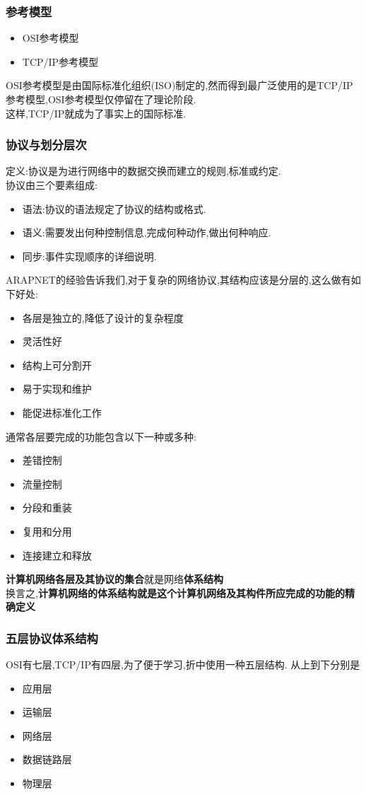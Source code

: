 \documentclass{ctexart}
\begin{document}
\subsubsection{参考模型}
\begin{itemize}
	\item OSI参考模型
	\item TCP/IP参考模型
\end{itemize}
OSI参考模型是由国际标准化组织(ISO)制定的,然而得到最广泛使用的是TCP/IP参考模型,OSI参考模型仅停留在了理论阶段.\\
这样,TCP/IP就成为了事实上的国际标准.
\subsubsection{协议与划分层次}
定义:协议是为进行网络中的数据交换而建立的规则,标准或约定.\\
协议由三个要素组成:
\begin{itemize}
	\item 语法:协议的语法规定了协议的结构或格式.
	\item 语义:需要发出何种控制信息,完成何种动作,做出何种响应.
	\item 同步:事件实现顺序的详细说明.
\end{itemize}
ARAPNET的经验告诉我们,对于复杂的网络协议,其结构应该是分层的,这么做有如下好处:
\begin{itemize}
	\item 各层是独立的,降低了设计的复杂程度
	\item 灵活性好
	\item 结构上可分割开
	\item 易于实现和维护
	\item 能促进标准化工作
\end{itemize}
通常各层要完成的功能包含以下一种或多种:
\begin{itemize}
	\item 差错控制
	\item 流量控制
	\item 分段和重装
	\item 复用和分用
	\item 连接建立和释放
\end{itemize}
\textbf{计算机网络各层及其协议的集合}就是网络\textbf{体系结构}\\
换言之,\textbf{计算机网络的体系结构就是这个计算机网络及其构件所应完成的功能的精确定义}
\subsubsection{五层协议体系结构}
OSI有七层,TCP/IP有四层,为了便于学习,折中使用一种五层结构.
从上到下分别是
\begin{itemize}
	\item 应用层
	\item 运输层
	\item 网络层
	\item 数据链路层
	\item 物理层
\end{itemize}
\end{document}
